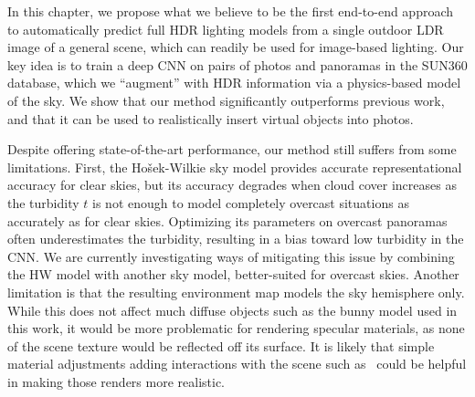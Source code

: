 
In this chapter, we propose what we believe to be the first end-to-end approach to automatically predict full HDR lighting models from a single outdoor LDR image of a general scene, which can readily be used for image-based lighting. Our key idea is to train a deep CNN on pairs of photos and panoramas in the SUN360 database, which we ``augment'' with HDR information via a physics-based model of the sky. We show that our method significantly outperforms previous work, and that it can be used to realistically insert virtual objects into photos.

Despite offering state-of-the-art performance, our method still suffers from some limitations. First, the Ho\v{s}ek-Wilkie sky model provides accurate representational accuracy for clear skies, but its accuracy degrades when cloud cover increases as the turbidity $t$ is not enough to model completely overcast situations as accurately as for clear skies. Optimizing its parameters on overcast panoramas often underestimates the turbidity, resulting in a bias toward low turbidity in the CNN. We are currently investigating ways of mitigating this issue by combining the HW model with another sky model, better-suited for overcast skies. Another limitation is that the resulting environment map models the sky hemisphere only. While this does not affect much diffuse objects such as the bunny model used in this work, it would be more problematic for rendering specular materials, as none of the scene texture would be reflected off its surface. It is likely that simple material adjustments adding interactions with the scene such as~\cite{khan-siggraph-06} could be helpful in making those renders more realistic. 

